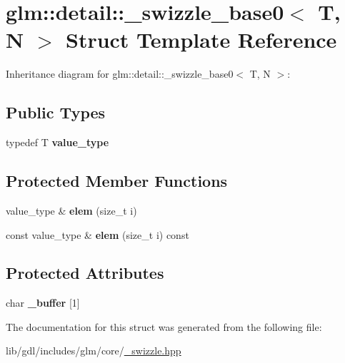 \hypertarget{structglm_1_1detail_1_1__swizzle__base0}{}\section{glm\+:\+:detail\+:\+:\+\_\+swizzle\+\_\+base0$<$ T, N $>$ Struct Template Reference}
\label{structglm_1_1detail_1_1__swizzle__base0}


Inheritance diagram for glm\+:\+:detail\+:\+:\+\_\+swizzle\+\_\+base0$<$ T, N $>$\+:
\subsection*{Public Types}
\begin{DoxyCompactItemize}
\item 
\hypertarget{structglm_1_1detail_1_1__swizzle__base0_ad38a739e1fe6d2db2674f34c98159c8f}{}typedef T {\bfseries value\+\_\+type}\label{structglm_1_1detail_1_1__swizzle__base0_ad38a739e1fe6d2db2674f34c98159c8f}

\end{DoxyCompactItemize}
\subsection*{Protected Member Functions}
\begin{DoxyCompactItemize}
\item 
\hypertarget{structglm_1_1detail_1_1__swizzle__base0_a88f08b952f849e69011cb9242d809738}{}value\+\_\+type \& {\bfseries elem} (size\+\_\+t i)\label{structglm_1_1detail_1_1__swizzle__base0_a88f08b952f849e69011cb9242d809738}

\item 
\hypertarget{structglm_1_1detail_1_1__swizzle__base0_aa091a75b3fbc0dd70f49f65225002e2a}{}const value\+\_\+type \& {\bfseries elem} (size\+\_\+t i) const \label{structglm_1_1detail_1_1__swizzle__base0_aa091a75b3fbc0dd70f49f65225002e2a}

\end{DoxyCompactItemize}
\subsection*{Protected Attributes}
\begin{DoxyCompactItemize}
\item 
\hypertarget{structglm_1_1detail_1_1__swizzle__base0_afd4b7f15c9acff4cdef808f559ffec2d}{}char {\bfseries \+\_\+buffer} \mbox{[}1\mbox{]}\label{structglm_1_1detail_1_1__swizzle__base0_afd4b7f15c9acff4cdef808f559ffec2d}

\end{DoxyCompactItemize}


The documentation for this struct was generated from the following file\+:\begin{DoxyCompactItemize}
\item 
lib/gdl/includes/glm/core/\hyperlink{__swizzle_8hpp}{\+\_\+swizzle.\+hpp}\end{DoxyCompactItemize}
